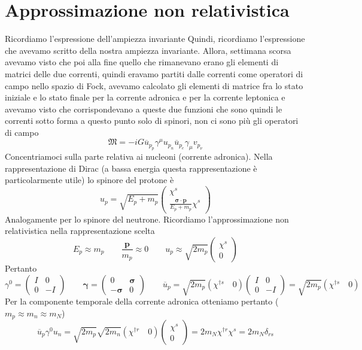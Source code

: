 \section{Approssimazione non relativistica}
Ricordiamo l'espressione dell'ampiezza invariante Quindi, ricordiamo l'espressione che avevamo scritto della nostra ampiezza invariante. Allora, settimana scorsa avevamo visto che poi alla fine quello che rimanevano erano gli elementi di matrici delle due correnti, quindi eravamo partiti dalle correnti come operatori di campo nello spazio di Fock, avevamo calcolato gli elementi di matrice fra lo stato iniziale e lo stato finale per la corrente adronica e per la corrente leptonica e avevamo visto che corrispondevano a queste due funzioni che sono quindi le correnti sotto forma a questo punto solo di spinori, non ci sono più gli operatori di campo 
$$
\mathfrak{M} = -iG \overline{u}_{p_p} \gamma^\mu u_{p_n} \overline{u}_{p_e} \gamma_\mu v_{p_\nu}
$$
Concentriamoci sulla parte relativa ai nucleoni (corrente adronica). Nella rappresentazione di Dirac (a bassa energia questa rappresentazione è particolarmente utile) lo spinore del protone è
$$
u_p = \sqrt{E_p + m_p} \begin{pmatrix} \chi^s \\ \frac{\boldsymbol{\sigma} \cdot \mathbf{p}}{E_p + m_p} \chi^s \end{pmatrix}
$$
Analogamente per lo spinore del neutrone. Ricordiamo l'approssimazione non relativistica nella rappresentazione scelta
$$
E_p \approx m_p \qquad \frac{\mathbf{p}}{m_p} \approx 0 \qquad u_p \approx \sqrt{2m_p} \begin{pmatrix} \chi^s \\ 0 \end{pmatrix}
$$
Pertanto
$$
\gamma^0 = \begin{pmatrix} I & 0 \\ 0 & -I \end{pmatrix} \qquad \boldsymbol{\gamma} = \begin{pmatrix} 0 & \boldsymbol{\sigma} \\ -\boldsymbol{\sigma} & 0 \end{pmatrix} \qquad \overline{u}_p = \sqrt{2m_p} (\chi^{\dagger s} \quad 0) \begin{pmatrix} I & 0 \\ 0 & -I \end{pmatrix} = \sqrt{2m_p} (\chi^{\dagger s} \quad 0)
$$
Per la componente temporale della corrente adronica otteniamo pertanto ($m_p\approx m_n\approx m_N$)
$$
\overline{u}_p \gamma^0 u_n = \sqrt{2m_p} \sqrt{2m_n} (\chi^{\dagger r} \quad 0) \begin{pmatrix} \chi^s \\ 0 \end{pmatrix} = 2m_N \chi^{\dagger r} \chi^s = 2m_N \delta_{rs}
$$

